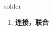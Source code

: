 
\begin{frame}
{\huge solder}
\begin{center}
\begin{enumerate}\Large
  \item \textbf{连接，联合}
\end{enumerate}
\end{center}
\end{frame}
